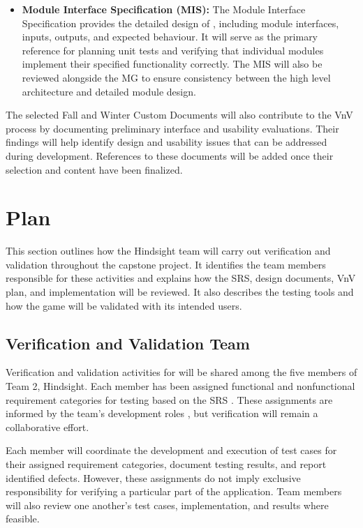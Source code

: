 \documentclass[10pt,titlepage]{article}
\begin{document}
\begin{itemize}
    \item \textbf{Module Interface Specification (MIS):}
    The Module Interface Specification \cite{MIS} provides
    the detailed design of \progname{}, including module
    interfaces, inputs, outputs, and expected behaviour.
    It will serve as the primary reference for planning
    unit tests and verifying that individual modules
    implement their specified functionality correctly.
    The MIS will also be reviewed alongside the MG
    to ensure consistency between the high level
    architecture and detailed module design.

\end{itemize}

The selected Fall and Winter Custom Documents will also
contribute to the VnV process by documenting preliminary
interface and usability evaluations. Their findings will
help identify design and usability issues that can be
addressed during development. References to these
documents will be added once their selection and content
have been finalized.

\newpage
\section{Plan}

This section outlines how the Hindsight team will carry out verification
and validation throughout the capstone project. It identifies the team members
responsible for these activities and explains how the SRS, design documents,
VnV plan, and implementation will be reviewed. It also describes the testing
tools and how the game will be validated with its intended users.

\subsection{Verification and Validation Team}\label{sec:vnvTeam}

Verification and validation activities for \progname{} will
be shared among the five members of Team 2, Hindsight.
Each member has been assigned functional and nonfunctional
requirement categories for testing based on the SRS
\cite{SRS}. These assignments are informed by the
team's development roles \cite{DevPlan}, but verification
will remain a collaborative effort. 

Each member will coordinate the development and execution
of test cases for their assigned requirement categories,
document testing results, and report identified defects.
However, these assignments do not imply exclusive
responsibility for verifying a particular part of the
application. Team members will also review one another's
test cases, implementation, and results where feasible. 
\end{document}
